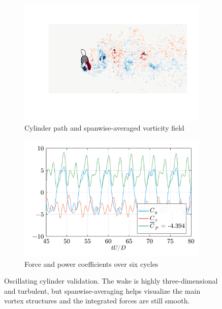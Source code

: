 \documentclass[10pt,a4paper]{article}
\begin{document}
\begin{figure}[!t]
    \begin{subfigure}{0.5\linewidth}
      \centering
        \includegraphics[width=1\linewidth,trim={130 70 20 50},clip]{img/OscCyl_flow_p7.pdf}
        \caption{Cylinder path and spanwise-averaged vorticity field}
    \end{subfigure}
    \begin{subfigure}{0.48\linewidth}
        \centering
        \includegraphics[width=0.9\linewidth,trim={0 0 0 20},clip]{img/OscCyl_hist_p7.pdf}
        \caption{Force and power coefficients over six cycles}
    \end{subfigure}
  \caption{Oscillating cylinder validation. The wake is highly three-dimensional and turbulent, but spanwise-averaging helps visualize the main vortex structures and the integrated forces are still smooth.}
  \label{fig:cyl_val}
\end{figure}
\end{document}
